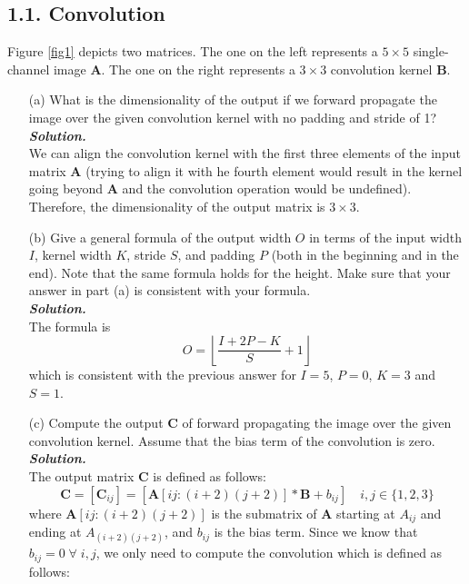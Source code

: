 \documentclass{article}
\newcommand{\matr}[1]{\bm{#1}}     %
\begin{document}
\subsection*{1.1. Convolution}
Figure \ref{fig1} depicts two matrices. The one on the left represents a $5\times 5$ single-channel image $\matr{A}$. The one on the right
 represents a $3\times 3$ convolution kernel $\matr{B}$. 
\begin{itemize}
    \item[(a)] What is the dimensionality of the output if we forward propagate the image over the given convolution kernel with no padding and stride of 1? \\
    \textbf{\textit{Solution.}} \\
    We can align the convolution kernel with the first three elements of the input matrix $\matr{A}$ (trying to align it with he fourth element would result in the kernel going beyond $\matr{A}$ and the convolution operation would be undefined). Therefore, the dimensionality of the output matrix is $3 \times 3$.
    \item[(b)] Give a general formula of the output width $O$ in terms of the input width $I$, kernel width $K$, stride $S$, and padding $P$ (both in the beginning and in the end). Note that the same formula holds for the height. Make sure that your answer in part (a) is consistent with your formula. \\
    \textbf{\textit{Solution.}} \\
    The formula is
    \begin{equation*}
        O = \left\lfloor \frac{I + 2P - K}{S} + 1 \right\rfloor
    \end{equation*}
    which is consistent with the previous answer for $I = 5$, $P = 0$, $K = 3$ and $S = 1$.
    \item[(c)] Compute the output $\matr{C}$ of forward propagating the image over the given convolution kernel. Assume that the bias term of the convolution is zero. \\
    \textbf{\textit{Solution.}} \\
    The output matrix $\matr{C}$ is defined as follows:
    \begin{equation*}
        \matr{C} = [\matr{C}_{ij}] = [\matr{A}[ij:(i+2)(j+2)] * \matr{B} + b_{ij}] \quad i,j\in\{1,2,3\}
    \end{equation*}
    where $\matr{A}[ij:(i+2)(j+2)]$ is the submatrix of $\matr{A}$ starting at $A_{ij}$ and ending at $A_{(i+2)(j+2)}$, and $b_{ij}$ is the bias term. Since we know that $b_{ij} = 0 \; \forall \; i,j$, we only need to compute the convolution which is defined as follows:

\end{itemize}
\end{document}
